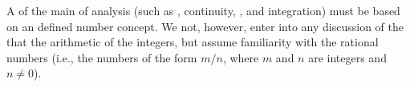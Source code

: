 \documentclass{ctexart}
\begin{document}
A  of the main  of analysis (such as , continuity, , and integration) must be based on an  defined number concept. We  not, however, enter into any discussion of the  that  the arithmetic of the integers, but assume familiarity with the rational numbers (i.e., the numbers of the form $m / n$, where $m$ and $n$ are integers and $n \neq 0$).

\listofmarks
\end{document}
